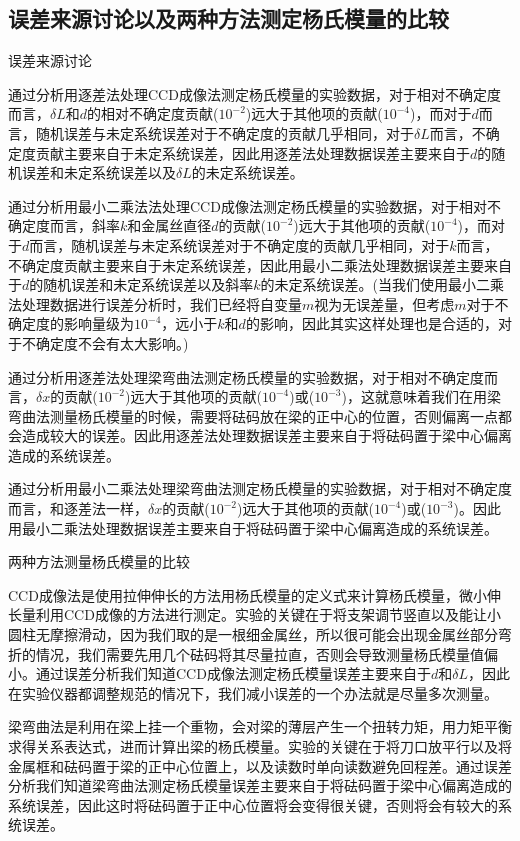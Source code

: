 \documentclass[a4 paper,12pt]{article}
\begin{document}
\subsection{误差来源讨论以及两种方法测定杨氏模量的比较}
\begin{center}
	误差来源讨论
\end{center}
\par 通过分析用逐差法处理CCD成像法测定杨氏模量的实验数据，对于相对不确定度而言，$\delta L$和$d$的相对不确定度贡献($10^{-2}$)远大于其他项的贡献($10^{-4}$)，而对于$d$而言，随机误差与未定系统误差对于不确定度的贡献几乎相同，对于$\delta L$而言，不确定度贡献主要来自于未定系统误差，因此用逐差法处理数据误差主要来自于$d$的随机误差和未定系统误差以及$\delta L$的未定系统误差。\\
\par 通过分析用最小二乘法法处理CCD成像法测定杨氏模量的实验数据，对于相对不确定度而言，斜率$k$和金属丝直径$d$的贡献($10^{-2}$)远大于其他项的贡献($10^{-4}$)，而对于$d$而言，随机误差与未定系统误差对于不确定度的贡献几乎相同，对于$k$而言，不确定度贡献主要来自于未定系统误差，因此用最小二乘法处理数据误差主要来自于$d$的随机误差和未定系统误差以及斜率$k$的未定系统误差。(当我们使用最小二乘法处理数据进行误差分析时，我们已经将自变量$m$视为无误差量，但考虑$m$对于不确定度的影响量级为$10^{-4}$，远小于$k$和$d$的影响，因此其实这样处理也是合适的，对于不确定度不会有太大影响。)\\
\par 通过分析用逐差法处理梁弯曲法测定杨氏模量的实验数据，对于相对不确定度而言，$\delta x$的贡献($10^{-2}$)远大于其他项的贡献($10^{-4}$)或($10^{-3}$)，这就意味着我们在用梁弯曲法测量杨氏模量的时候，需要将砝码放在梁的正中心的位置，否则偏离一点都会造成较大的误差。因此用逐差法处理数据误差主要来自于将砝码置于梁中心偏离造成的系统误差。\\
\par 通过分析用最小二乘法处理梁弯曲法测定杨氏模量的实验数据，对于相对不确定度而言，和逐差法一样，$\delta x$的贡献($10^{-2}$)远大于其他项的贡献($10^{-4}$)或($10^{-3}$)。因此用最小二乘法处理数据误差主要来自于将砝码置于梁中心偏离造成的系统误差。
\begin{center}
	两种方法测量杨氏模量的比较
\end{center}
\par CCD成像法是使用拉伸伸长的方法用杨氏模量的定义式来计算杨氏模量，微小伸长量利用CCD成像的方法进行测定。实验的关键在于将支架调节竖直以及能让小圆柱无摩擦滑动，因为我们取的是一根细金属丝，所以很可能会出现金属丝部分弯折的情况，我们需要先用几个砝码将其尽量拉直，否则会导致测量杨氏模量值偏小。通过误差分析我们知道CCD成像法测定杨氏模量误差主要来自于$d$和$\delta L$，因此在实验仪器都调整规范的情况下，我们减小误差的一个办法就是尽量多次测量。\\
\par 梁弯曲法是利用在梁上挂一个重物，会对梁的薄层产生一个扭转力矩，用力矩平衡求得关系表达式，进而计算出梁的杨氏模量。实验的关键在于将刀口放平行以及将金属框和砝码置于梁的正中心位置上，以及读数时单向读数避免回程差。通过误差分析我们知道梁弯曲法测定杨氏模量误差主要来自于将砝码置于梁中心偏离造成的系统误差，因此这时将砝码置于正中心位置将会变得很关键，否则将会有较大的系统误差。
\end{document}
